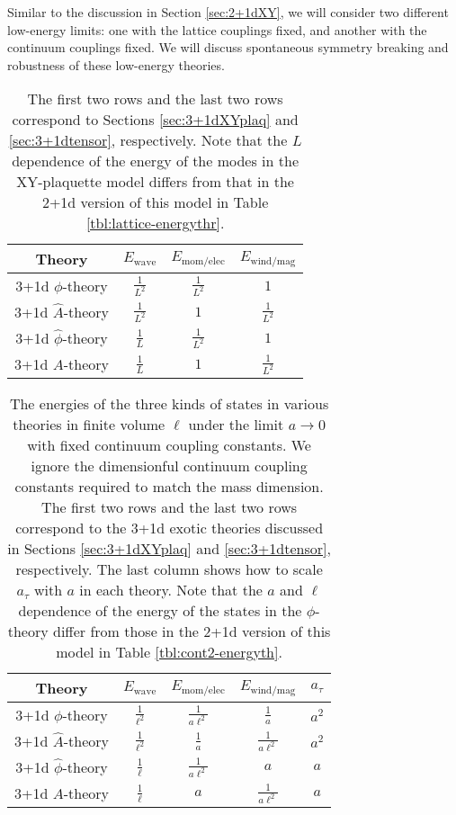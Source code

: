 \documentclass[12pt]{article}
\numberwithin{equation}{section}
\begin{document}
Similar to the discussion in Section \ref{sec:2+1dXY}, we will consider two different low-energy limits: one with the lattice couplings fixed, and another with the continuum couplings fixed. We will discuss spontaneous symmetry breaking and robustness of these low-energy theories.

\begin{table}
\begin{center}
\begin{tabular}{|c|c|c|c|}
\hline
Theory & $E_\text{wave}$ & $E_\text{mom/elec}$ & $E_\text{wind/mag}$
\tabularnewline
\hline
3+1d $\phi$-theory & $\frac{1}{L^2}$ & $\frac{1}{L^2}$ & $1$
\tabularnewline
3+1d $\hat A$-theory & $\frac{1}{L^2}$ & $1$ & $\frac{1}{L^2}$
\tabularnewline
\hline
3+1d $\hat \phi$-theory & $\frac{1}{L}$ & $\frac{1}{L^2}$ & $1$
\tabularnewline
3+1d $A$-theory & $\frac{1}{L}$ & $1$ & $\frac{1}{L^2}$
\tabularnewline
\hline
\end{tabular}
\caption{
 The first two rows and the last two rows correspond to Sections \ref{sec:3+1dXYplaq} and \ref{sec:3+1dtensor}, respectively.
Note that the $L$ dependence of the energy of the modes in the XY-plaquette model differs from that in the 2+1d version of this model in Table \ref{tbl:lattice-energythr}.}\label{tbl:lattice-energy}
\end{center}
\end{table}


\begin{table}[t]
	\begin{center}
		\begin{tabular}{|c|c|c|c|c|}
			\hline
			Theory & $E_\text{wave}$ & $E_\text{mom/elec}$ & $E_\text{wind/mag}$ & $a_\tau$
			\tabularnewline
			\hline
			3+1d $\phi$-theory & $\frac{1}{\ell^2}$ & $\frac{1}{a \ell^2}$ & $\frac{1}{a}$ & $a^2$
			\tabularnewline
			3+1d $\hat A$-theory & $\frac{1}{\ell^2}$ & $\frac{1}{a}$ & $\frac{1}{a \ell^2}$ & $a^2$
			\tabularnewline
			\hline
			3+1d $\hat \phi$-theory & $\frac{1}{\ell}$ & $\frac{1}{a\ell^2}$ & $a$ & $a$
			\tabularnewline
			3+1d $A$-theory & $\frac{1}{\ell}$ & $a$ & $\frac{1}{a\ell^2}$ & $a$
			\tabularnewline
			\hline
		\end{tabular}
		\caption{The energies of the three kinds of states in various theories  in finite volume $\ell$ under the  limit $a \rightarrow 0$ with fixed continuum coupling constants. We ignore the dimensionful continuum coupling constants required to match the mass dimension. The first two rows and the last two rows correspond to the 3+1d exotic theories discussed in Sections \ref{sec:3+1dXYplaq} and \ref{sec:3+1dtensor}, respectively. The last column shows how to scale $a_\tau$ with $a$ in each theory.  Note that the $a$ and  $\ell$ dependence of the energy of the states in the $\phi$-theory differ from those in the 2+1d version of this model in Table \ref{tbl:cont2-energyth}.} \label{tbl:cont2-energy}
	\end{center}
\end{table}
\end{document}
